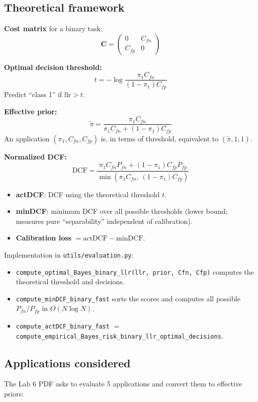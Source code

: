 \documentclass[11pt,a4paper]{article}
\newcommand{\actDCF}{\textrm{actDCF}}
\newcommand{\minDCF}{\textrm{minDCF}}
\newcommand{\DCF}{\textrm{DCF}}
\newcommand{\llr}{\textrm{llr}}
\begin{document}
\subsection{Theoretical framework}

\textbf{Cost matrix} for a binary task:
\[
\mathbf{C} =
\begin{pmatrix}
0       & C_{fn} \\
C_{fp}  & 0
\end{pmatrix}
\]

\textbf{Optimal decision threshold:}
\[
   t = -\log\!\frac{\pi_1 C_{fn}}{(1-\pi_1) C_{fp}}
\]
Predict ``class 1'' if $\llr > t$.

\textbf{Effective prior:}
\[
   \tilde{\pi} = \frac{\pi_1 C_{fn}}{\pi_1 C_{fn} + (1-\pi_1) C_{fp}}
\]
An application $(\pi_1, C_{fn}, C_{fp})$ is, in terms of threshold,
equivalent to $(\tilde{\pi}, 1, 1)$.

\textbf{Normalized DCF:}
\[
   \DCF = \frac{\pi_1 C_{fn} P_{fn} + (1-\pi_1) C_{fp} P_{fp}}{\min(\pi_1 C_{fn},\,(1-\pi_1) C_{fp})}
\]

\begin{itemize}
\item \textbf{actDCF}: DCF using the theoretical threshold $t$.
\item \textbf{minDCF}: minimum DCF over all possible thresholds
      (lower bound; measures pure ``separability'' independent of
      calibration).
\item \textbf{Calibration loss} $= \actDCF - \minDCF$.
\end{itemize}

Implementation in \texttt{utils/evaluation.py}:
\begin{itemize}
\item \texttt{compute\_optimal\_Bayes\_binary\_llr(llr, prior, Cfn, Cfp)}
      computes the theoretical threshold and decisions.
\item \texttt{compute\_minDCF\_binary\_fast} sorts the scores and
      computes all possible $P_{fn}/P_{fp}$ in $O(N\log N)$.
\item \texttt{compute\_actDCF\_binary\_fast} $=$
      \texttt{compute\_empirical\_Bayes\_risk\_binary\_llr\_optimal\_decisions}.
\end{itemize}

\subsection{Applications considered}

The Lab 6 PDF asks to evaluate 5 applications and convert them to
effective priors:
\end{document}

